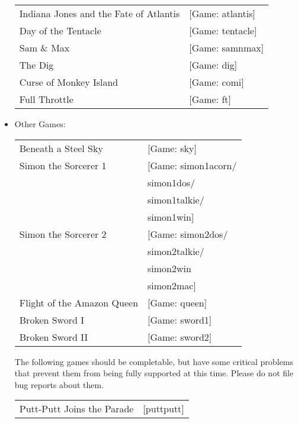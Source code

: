 \begin{itemize}
\begin {tabular} [h] {ll}
    Indiana Jones and the Fate of Atlantis&          [Game: atlantis]\\
    Day of the Tentacle&                             [Game: tentacle]\\
    Sam \& Max&                                       [Game: samnmax]\\
    The Dig&                                        [Game: dig]\\
    Curse of Monkey Island&                          [Game: comi]\\
    Full Throttle&                                 [Game: ft]\\
  \end{tabular}
\item Other Games:\\ 
  \begin{tabular}[h]{ll}
     Beneath a Steel Sky&                             [Game: sky]\\
     Simon the Sorcerer 1&                            [Game: simon1acorn/\\
     &                                                       simon1dos/\\
     &                                                       simon1talkie/\\
     &                                                       simon1win]\\
     Simon the Sorcerer 2&                            [Game: simon2dos/\\
     &                                                       simon2talkie/\\
     &                                                       simon2win\\
     &                                                       simon2mac]\\
    Flight of the Amazon Queen&                    [Game: queen]\\
    Broken Sword I&                                [Game: sword1]\\
    Broken Sword II&                               [Game: sword2]\\
  \end{tabular}

The following games should be completable, but have some critical problems that
prevent them from being fully supported at this time. Please do not file bug
reports about them.

  \begin{tabular}[h]{ll}
	Putt-Putt Joins the Parade& [puttputt]\\
  \end{tabular}


\end{itemize}
